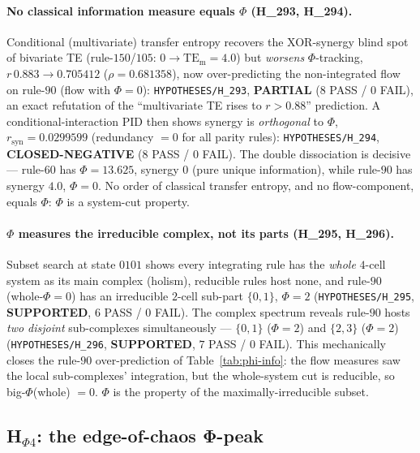 \paragraph{No classical information measure equals $\Phi$ (H\_293, H\_294).}
Conditional (multivariate) transfer entropy recovers the XOR-synergy blind spot of
bivariate TE (rule-$150$/$105$: $0\rightarrow\mathrm{TE_m}{=}4.0$) but \emph{worsens}
$\Phi$-tracking, $r\,0.883\rightarrow0.705412$ ($\rho{=}0.681358$), now over-predicting
the non-integrated flow on rule-$90$ (flow with $\Phi{=}0$): \texttt{HYPOTHESES/H\_293},
\textbf{PARTIAL} ($8$ PASS / $0$ FAIL), an exact refutation of the ``multivariate TE
rises to $r{>}0.88$'' prediction. A conditional-interaction PID then shows synergy is
\emph{orthogonal} to $\Phi$, $r_\text{syn}=0.0299599$ (redundancy $=0$ for all parity
rules): \texttt{HYPOTHESES/H\_294}, \textbf{CLOSED-NEGATIVE} ($8$ PASS / $0$ FAIL). The
double dissociation is decisive --- rule-$60$ has $\Phi{=}13.625$, synergy $0$ (pure
unique information), while rule-$90$ has synergy $4.0$, $\Phi{=}0$. No order of classical
transfer entropy, and no flow-component, equals $\Phi$: $\Phi$ is a system-cut property.

\paragraph{$\Phi$ measures the irreducible complex, not its parts (H\_295, H\_296).}
\label{app:universe-exclusion}
Subset search at state $0101$ shows every integrating rule has the \emph{whole}
$4$-cell system as its main complex (holism), reducible rules host none, and rule-$90$
(whole-$\Phi{=}0$) has an irreducible $2$-cell sub-part $\{0,1\}$, $\Phi{=}2$
(\texttt{HYPOTHESES/H\_295}, \textbf{SUPPORTED}, $6$ PASS / $0$ FAIL). The complex
spectrum reveals rule-$90$ hosts \emph{two disjoint} sub-complexes simultaneously ---
$\{0,1\}$ ($\Phi{=}2$) and $\{2,3\}$ ($\Phi{=}2$) (\texttt{HYPOTHESES/H\_296},
\textbf{SUPPORTED}, $7$ PASS / $0$ FAIL). This mechanically closes the rule-$90$
over-prediction of Table~\ref{tab:phi-info}: the flow measures saw the local
sub-complexes' integration, but the whole-system cut is reducible, so big-$\Phi$(whole)
$=0$. $\Phi$ is the property of the maximally-irreducible subset.

\subsection{H$_{\Phi 4}$: the edge-of-chaos Φ-peak}
\label{app:phi-edge}

